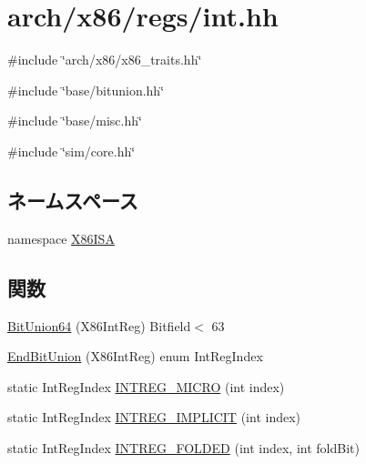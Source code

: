 \hypertarget{int_8hh}{
\section{arch/x86/regs/int.hh}
\label{int_8hh}
}
{\ttfamily \#include \char`\"{}arch/x86/x86\_\-traits.hh\char`\"{}}\par
{\ttfamily \#include \char`\"{}base/bitunion.hh\char`\"{}}\par
{\ttfamily \#include \char`\"{}base/misc.hh\char`\"{}}\par
{\ttfamily \#include \char`\"{}sim/core.hh\char`\"{}}\par
\subsection*{ネームスペース}
\begin{DoxyCompactItemize}
\item 
namespace \hyperlink{namespaceX86ISA}{X86ISA}
\end{DoxyCompactItemize}
\subsection*{関数}
\begin{DoxyCompactItemize}
\item 
\hyperlink{namespaceX86ISA_a10715f66efb544706934aad138792efd}{BitUnion64} (X86IntReg) Bitfield$<$ 63
\item 
\hyperlink{namespaceX86ISA_ad59b56d2c756ba2c3ed73fda3a246a3a}{EndBitUnion} (X86IntReg) enum IntRegIndex
\item 
static IntRegIndex \hyperlink{namespaceX86ISA_a8bb7e419ce07ff5a21dd4fc4a9f62dad}{INTREG\_\-MICRO} (int index)
\item 
static IntRegIndex \hyperlink{namespaceX86ISA_a6920fb8f756a52ab3ff6b34df60f836c}{INTREG\_\-IMPLICIT} (int index)
\item 
static IntRegIndex \hyperlink{namespaceX86ISA_a747f6995af14f9cf225a0a9385d157f4}{INTREG\_\-FOLDED} (int index, int foldBit)
\end{DoxyCompactItemize}
